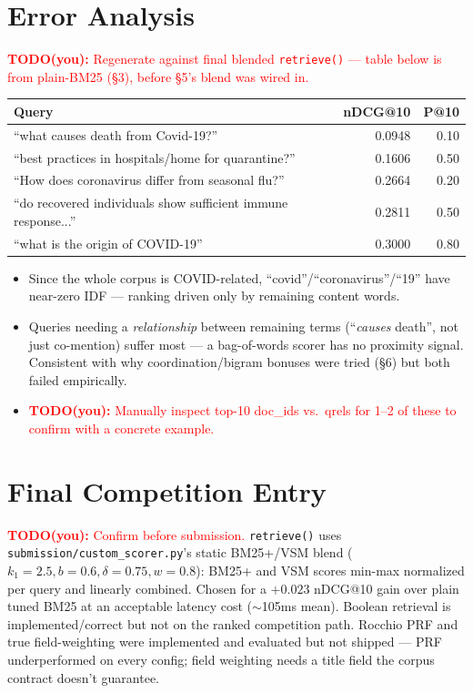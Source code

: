 \documentclass[10pt]{article}
\newcommand{\todo}[1]{\textcolor{red}{\textbf{TODO(you):} #1}}
\begin{document}
\section{Error Analysis}
\todo{Regenerate against final blended \texttt{retrieve()} --- table below is from plain-BM25 (\S3), before \S5's blend was wired in.}
\begin{table}[h]
\centering\small
\begin{tabular}{p{9cm}rr}
\toprule
Query & nDCG@10 & P@10 \\
\midrule
``what causes death from Covid-19?'' & 0.0948 & 0.10 \\
``best practices in hospitals/home for quarantine?'' & 0.1606 & 0.50 \\
``How does coronavirus differ from seasonal flu?'' & 0.2664 & 0.20 \\
``do recovered individuals show sufficient immune response...'' & 0.2811 & 0.50 \\
``what is the origin of COVID-19'' & 0.3000 & 0.80 \\
\bottomrule
\end{tabular}
\end{table}
\begin{itemize}
\item Since the whole corpus is COVID-related, ``covid''/``coronavirus''/``19'' have near-zero IDF --- ranking driven only by remaining content words.
\item Queries needing a \emph{relationship} between remaining terms (``\emph{causes} death'', not just co-mention) suffer most --- a bag-of-words scorer has no proximity signal. Consistent with why coordination/bigram bonuses were tried (\S6) but both failed empirically.
\item \todo{Manually inspect top-10 doc\_ids vs.\ qrels for 1--2 of these to confirm with a concrete example.}
\end{itemize}

\section{Final Competition Entry}
\todo{Confirm before submission.} \texttt{retrieve()} uses \texttt{submission/custom\_scorer.py}'s static BM25+/VSM blend ($k_1{=}2.5,b{=}0.6,\delta{=}0.75,w{=}0.8$): BM25+ and VSM scores min-max normalized per query and linearly combined. Chosen for a $+0.023$ nDCG@10 gain over plain tuned BM25 at an acceptable latency cost ($\sim$105ms mean). Boolean retrieval is implemented/correct but not on the ranked competition path. Rocchio PRF and true field-weighting were implemented and evaluated but not shipped --- PRF underperformed on every config; field weighting needs a title field the corpus contract doesn't guarantee.
\end{document}
